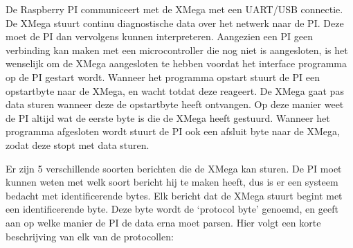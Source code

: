 De Raspberry PI communiceert met de XMega met een UART/USB connectie. De XMega stuurt continu diagnostische data over het netwerk naar de PI. Deze moet de PI dan vervolgens kunnen interpreteren. Aangezien een PI geen verbinding kan maken met een microcontroller die nog niet is aangesloten, is het wenselijk om de XMega aangesloten te hebben voordat het interface programma op de PI gestart wordt. Wanneer het programma opstart stuurt de PI een opstartbyte naar de XMega, en wacht totdat deze reageert. De XMega gaat pas data sturen wanneer deze de opstartbyte heeft ontvangen. Op deze manier weet de PI altijd wat de eerste byte is die de XMega heeft gestuurd. Wanneer het programma afgesloten wordt stuurt de PI ook een afsluit byte naar de XMega, zodat deze stopt met data sturen.

Er zijn 5 verschillende soorten berichten die de XMega kan sturen. De PI moet kunnen weten met welk soort bericht hij te maken heeft, dus is er een systeem bedacht met identificerende bytes. Elk bericht dat de XMega stuurt begint met een identificerende byte. Deze byte wordt de `protocol byte' genoemd, en geeft aan op welke manier de PI de data erna moet parsen. Hier volgt een korte beschrijving van elk van de protocollen:

